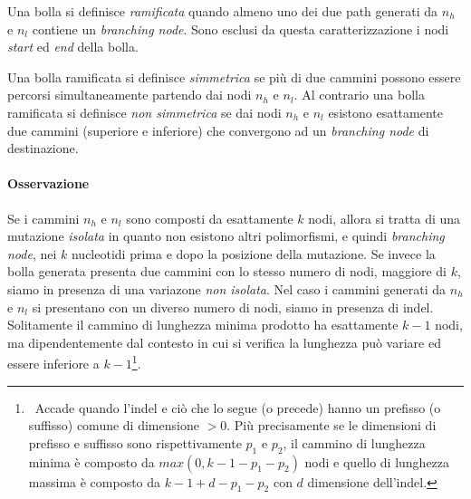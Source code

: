 \documentclass[../main.tex]{subfiles}
\begin{document}
\begin{definition}
Una bolla si definisce \textit{ramificata} quando almeno uno dei due path generati da $n_h$ e $n_l$ contiene un \textit{branching node}. Sono esclusi da questa caratterizzazione i nodi \textit{start} ed \textit{end} della bolla.
\end{definition}

\begin{definition}
Una bolla ramificata si definisce \textit{simmetrica} se più di due cammini possono essere percorsi simultaneamente partendo dai nodi $n_h$ e $n_l$. Al contrario una bolla ramificata si definisce \textit{non simmetrica} se dai nodi $n_h$ e $n_l$ esistono esattamente due cammini (superiore e inferiore) che convergono ad un \textit{branching node} di destinazione.
\end{definition}

\paragraph{Osservazione} Se i cammini $n_h$ e $n_l$ sono composti da esattamente $k$ nodi, allora si tratta di una mutazione \textit{isolata} in quanto non esistono altri polimorfismi, e quindi \textit{branching node}, nei $k$ nucleotidi prima e dopo la posizione della mutazione. Se invece la bolla generata presenta due cammini con lo stesso numero di nodi, maggiore di $k$, siamo in presenza di una variazone \textit{non isolata}. Nel caso i cammini generati da $n_h$ e $n_l$ si presentano con un diverso numero di nodi, siamo in presenza di indel. Solitamente il cammino di lunghezza minima prodotto ha esattamente $k-1$ nodi, ma dipendentemente dal contesto in cui si verifica la lunghezza può variare ed essere inferiore a $k-1$\footnote{\ Accade quando l'indel e ciò che lo segue (o precede) hanno un prefisso (o suffisso) comune di dimensione $> 0$. Più precisamente se le dimensioni di prefisso e suffisso sono rispettivamente $p_1$ e $p_2$, il cammino di lunghezza minima è composto da $max(0, k-1-p_1 - p_2)$ nodi e quello di lunghezza massima è composto da $k-1+d-p_1 - p_2$ con $d$ dimensione dell'indel.}.\\
\end{document}

